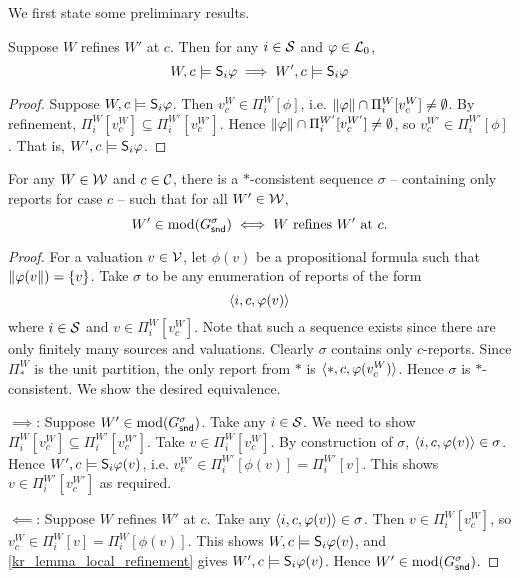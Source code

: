 We first state some preliminary results.

\begin{lemma}
    \label{kr_lemma_local_refinement}
    Suppose $W$ refines $W'$ at $c$. Then for any $i \in \srcs$ and $\phi \in
    \lprop$,
    \[
        W, c \models \S_i\phi
        \implies
        W', c \models \S_i\phi
    \]
\end{lemma}

\begin{proof}
    Suppose $W, c \models \S_i\phi$. Then $v^W_c \in \Pi^W_i[\phi]$, i.e.
    $\propmods{\phi} \cap \Pi^W_i[v^W_c] \ne \emptyset$. By refinement,
    $\Pi^W_i[v^W_c] \subseteq \Pi^{W'}_i[v^{W'}_c]$. Hence $\propmods{\phi}
    \cap \Pi^{W'}_i[v^{W'}_c] \ne \emptyset$, so $v^{W'}_c \in
    \Pi^{W'}_i[\phi]$. That is, $W', c \models \S_i\phi$.
\end{proof}

\begin{lemma}
    \label{kr_lemma_local_refinement_sequence}
    For any $W \in \W$ and $c \in \C$, there is a $\ast$-consistent sequence
    $\sigma$ -- containing only reports for case $c$ -- such that for all $W'
    \in \W$,
    \[
        W' \in \mods(G^\sigma_\snd)
        \iff
        W \text{ refines } W' \text{ at } c.
    \]
\end{lemma}

\begin{proof}

    For a valuation $v \in \vals$, let $\phi(v)$ be a propositional formula
    such that $\propmods{\phi(v}) = \{v\}$. Take $\sigma$ to be any enumeration
    of reports of the form
    \[
        \tuple{i, c, \phi(v)}
    \]
    where $i \in \srcs$ and $v \in \Pi^W_i[v^W_c]$. Note that such a sequence
    exists since there are only finitely many sources and valuations. Clearly
    $\sigma$ contains only $c$-reports. Since $\Pi^W_\ast$ is the unit
    partition, the only report from $\ast$ is $\tuple{\ast, c, \phi(v^W_c)}$.
    Hence $\sigma$ is $\ast$-consistent. We show the desired equivalence.

    $\implies$: Suppose $W' \in \mods(G^\sigma_\snd)$. Take any $i \in \srcs$. We
    need to show $\Pi^W_i[v^W_c] \subseteq \Pi^{W'}_i[v^{W'}_c]$. Take $v \in
    \Pi^W_i[v^W_c]$. By construction of $\sigma$, $\tuple{i, c, \phi(v)} \in
    \sigma$. Hence $W', c \models \S_i\phi(v)$, i.e. $v^{W'}_c \in
    \Pi^{W'}_i[\phi(v)] = \Pi^{W'}_i[v]$. This shows $v \in
    \Pi^{W'}_i[v^{W'}_c]$ as required.

    $\impliedby$: Suppose $W$ refines $W'$ at $c$. Take any $\tuple{i, c,
    \phi(v)} \in \sigma$. Then $v \in \Pi^W_i[v^W_c]$, so $v^W_c \in \Pi^W_i[v]
    = \Pi^W_i[\phi(v)]$. This shows $W, c \models \S_i\phi(v)$, and
    \cref{kr_lemma_local_refinement} gives $W', c \models \S_i\phi(v)$. Hence $W'
    \in \mods(G^\sigma_\snd)$.

\end{proof}

